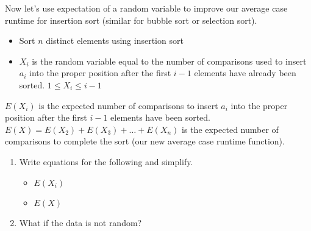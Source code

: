 \documentclass[12pt]{report}
\begin{document}
\noindent Now let's use expectation of a random variable to improve our average case runtime for insertion sort (similar for bubble sort or selection sort).
\begin{itemize}
	\item Sort $n$ distinct elements using insertion sort
	\item $X_{i}$ is the random variable equal to the number of comparisons used to insert $a_{i}$ into the proper position after the first $i-1$ elements have already been sorted. $1 \leq X_{i} \leq i-1$
\end{itemize}
$E(X_{i})$ is the expected number of comparisons to insert $a_{i}$ into the proper position after the first $i-1$ elements have been sorted.\\

\noindent $E(X)=E(X_{2})+E(X_{3})+\dots+E(X_{n})$ is the expected number of comparisons to complete the sort (our new average case runtime function).

\begin{enumerate}[label=\arabic*., start=6]
    \item Write equations for the following and simplify. \notes{\[ \sum_{j=1}^{n}j=\frac{(n)(n+1)}{2}  \]}
	\begin{itemize}
		\item $E(X_{i})$
		\item $E(X)$ \answer{\[ \sum_{i=2}^{n}\left( \frac{i}{2} \right)=O(n^{2})  \]}	%
	\end{itemize}
	\item What if the data is not random?
\end{enumerate}
\end{document}
